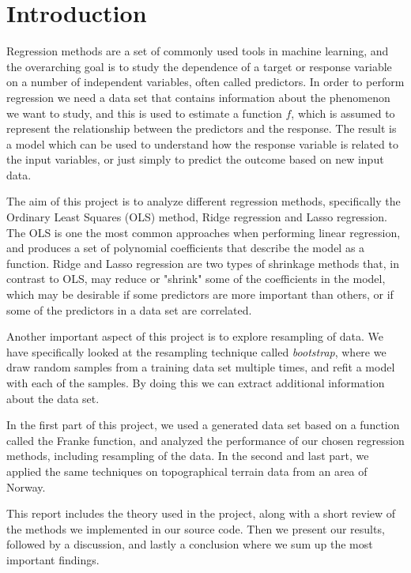 \section{Introduction}\label{sec:Introduction}

Regression methods are a set of commonly used tools in machine learning, and the overarching goal is to study the dependence of a target or response variable on a number of independent variables, often called predictors. In order to perform regression we need a data set that contains information about the phenomenon we want to study, and this is used to estimate a function $f$, which is assumed to represent the relationship between the predictors and the response. The result is a model which can be used to understand how the response variable is related to the input variables, or just simply to predict the outcome based on new input data.

The aim of this project is to analyze different regression methods, specifically the Ordinary Least Squares (OLS) method, Ridge regression and Lasso regression. The OLS is one the most common approaches when performing linear regression, and produces a set of polynomial coefficients that describe the model as a function. Ridge and Lasso regression are two types of shrinkage methods that, in contrast to OLS, may reduce or "shrink" some of the coefficients in the model, which may be desirable if some predictors are more important than others, or if some of the predictors in a data set are correlated.

Another important aspect of this project is to explore resampling of data. We have specifically looked at the resampling technique called \textit{bootstrap}, where we draw random samples from a training data set multiple times, and refit a model with each of the samples. By doing this we can extract additional information about the data set.

In the first part of this project, we used a generated data set based on a function called the Franke function, and analyzed the performance of our chosen regression methods, including resampling of the data. In the second and last part, we applied the same techniques on topographical terrain data from an area of Norway.

This report includes the theory used in the project, along with a short review of the methods we implemented in our source code. Then we present our results, followed by a discussion, and lastly a conclusion where we sum up the most important findings.